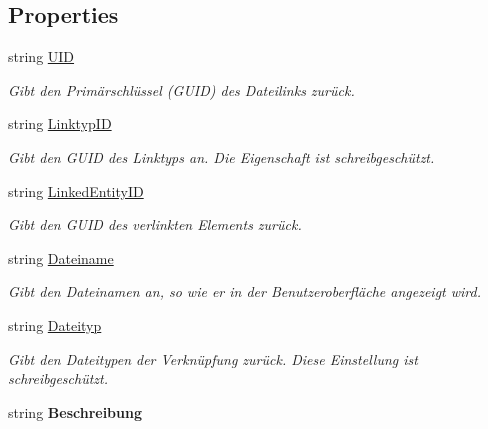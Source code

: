 \subsection*{Properties}
\begin{DoxyCompactItemize}
\item 
string \hyperlink{class_products_1_1_model_1_1_entities_1_1_dateilink_a65bccfd6a82f64537ccde27720c9a908}{U\+ID}
\begin{DoxyCompactList}\small\item\em Gibt den Primärschlüssel (G\+U\+ID) des Dateilinks zurück. \end{DoxyCompactList}\item 
string \hyperlink{class_products_1_1_model_1_1_entities_1_1_dateilink_aaceb6ffc7565c9f38d839e027e18ac7b}{Linktyp\+ID}
\begin{DoxyCompactList}\small\item\em Gibt den G\+U\+ID des Linktyps an. Die Eigenschaft ist schreibgeschützt. \end{DoxyCompactList}\item 
string \hyperlink{class_products_1_1_model_1_1_entities_1_1_dateilink_a2dadbda9353835b7abc44b06f393f691}{Linked\+Entity\+ID}
\begin{DoxyCompactList}\small\item\em Gibt den G\+U\+ID des verlinkten Elements zurück. \end{DoxyCompactList}\item 
string \hyperlink{class_products_1_1_model_1_1_entities_1_1_dateilink_a76c3eb7329240e667fb83cff0063deea}{Dateiname}
\begin{DoxyCompactList}\small\item\em Gibt den Dateinamen an, so wie er in der Benutzeroberfläche angezeigt wird. \end{DoxyCompactList}\item 
string \hyperlink{class_products_1_1_model_1_1_entities_1_1_dateilink_aca894ef4d365c70fbb095297514ee204}{Dateityp}
\begin{DoxyCompactList}\small\item\em Gibt den Dateitypen der Verknüpfung zurück. Diese Einstellung ist schreibgeschützt. \end{DoxyCompactList}\item 
string {\bfseries Beschreibung}\hypertarget{class_products_1_1_model_1_1_entities_1_1_dateilink_a8e537def2b2d5b829bc6d18df629e7d4}{}\label{class_products_1_1_model_1_1_entities_1_1_dateilink_a8e537def2b2d5b829bc6d18df629e7d4}


\end{DoxyCompactItemize}
